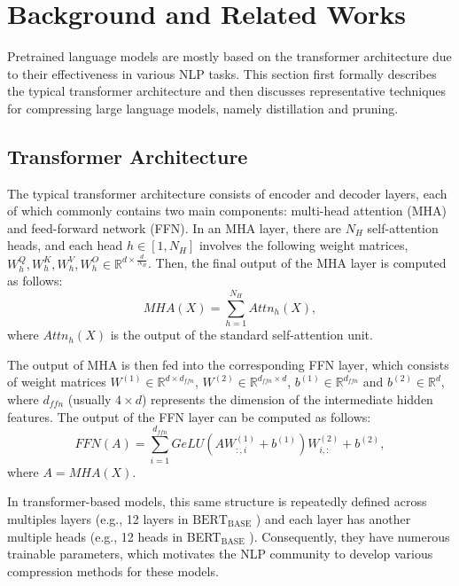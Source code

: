 \section{Background and Related Works} \label{sec:related}
Pretrained language models \cite{BERT,Roberta,GPT} are mostly based on the transformer architecture \cite{Vaswani2017} due to their effectiveness in various NLP tasks. This section first formally describes the typical transformer architecture and then discusses representative techniques for compressing large language models, namely distillation and pruning.


\subsection{Transformer Architecture}
The typical transformer architecture consists of encoder and decoder layers, each of which commonly contains two main components: multi-head attention (MHA) and feed-forward network (FFN). In an MHA layer, there are $N_H$ self-attention heads, and each head $h \in [1, N_H]$ involves the following weight matrices, $W_{h}^{Q}, W_{h}^{K}, W_{h}^{V}, W_{h}^{O} \in \mathbb{R}^{{d} \times\frac{d}{N_H}}$. Then, the final output of the MHA layer is computed as follows:
$$
MHA(X)= \sum_{h = 1}^{N_{H}} Attn_{h}(X),
$$
where $Attn_{h}(X)$ is the output of the standard self-attention unit.

The output of MHA is then fed into the corresponding FFN layer, which consists of weight matrices $W^{(1)}\in \mathbb{R}^{d \times d_{ffn}}$, $W^{(2)}\in \mathbb{R}^{d_{ffn} \times d}$, $b^{(1)}\in \mathbb{R}^{d_{ffn}}$ and $b^{(2)}\in \mathbb{R}^{d}$, where $d_{ffn}$ (usually $4\times d$) represents the dimension of the
intermediate hidden features. The output of the FFN layer can be computed as follows:
$$
FFN(A)=\sum_{i=1}^{d_{ffn}}GeLU(AW^{(1)}_{:,i}+b^{(1)})W^{(2)}_{i,:}+b^{(2)},
$$
where $A = MHA(X)$.

In transformer-based models, this same structure is repeatedly defined across multiples layers (e.g., 12 layers in $\text{BERT}_{\text{BASE}}$ \cite{BERT}) and each layer has another multiple heads (e.g., 12 heads in BERT$_{\text{BASE}}$ \cite{BERT}). Consequently, they have numerous trainable parameters, which motivates the NLP community to develop various compression methods for these models.


